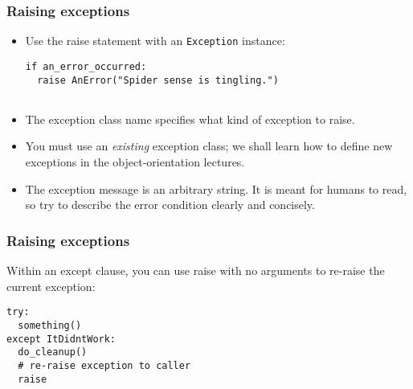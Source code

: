 \begin{frame}[fragile]\frametitle{Raising exceptions}

\begin{itemize}
\item   Use the raise statement with an \lstinline{Exception}
  instance:
\begin{lstlisting}
if an_error_occurred:
  raise AnError("Spider sense is tingling.")
 
\end{lstlisting}

\item The exception class name specifies what kind of exception to raise.

\item   You must use an \emph{existing} exception class; we shall learn
  how to define new exceptions in the object-orientation lectures.

\item   The exception message is an arbitrary string.  It is meant for
  humans to read, so try to describe the error condition clearly and
  concisely.
\end{itemize}

 
\end{frame}

\begin{frame}[fragile]\frametitle{Raising exceptions}
  Within an except clause, you can use raise
  with no arguments to re-raise the current exception:
\begin{lstlisting}
try:
  something()
except ItDidntWork:
  do_cleanup()
  # re-raise exception to caller
  raise
\end{lstlisting}
\end{frame}

